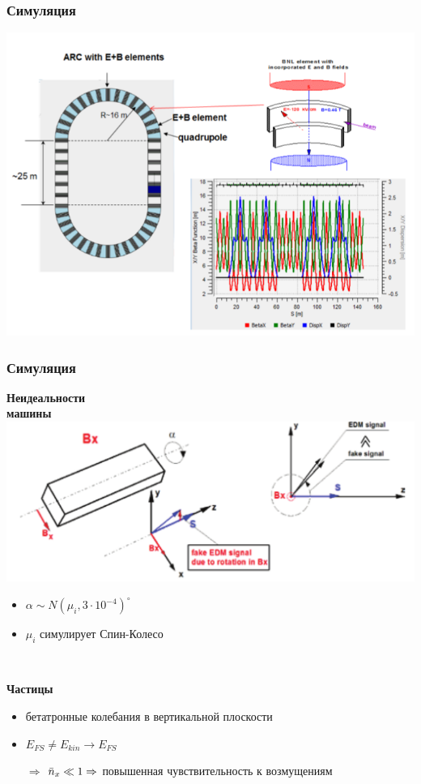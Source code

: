 \documentclass[14pt]{beamer}
\begin{document}
\begin{frame}\frametitle{Симуляция}\centering
	\includegraphics[width=.8\linewidth]{chapter2/BNL_lattice}
\end{frame}
\begin{frame}\frametitle{Симуляция}
	\begin{minipage}[t]{.48\linewidth}
		\textbf{Неидеальности\\ машины}
		\includegraphics[width=1.2\linewidth, trim=80 10 0 0, clip]{images/magnet_tilting}
		\begin{itemize}
			\item $\alpha\sim N(\mu_i, 3\cdot10^{-4})^\circ$
			\item $\mu_i$ симулирует Спин-Колесо 
		\end{itemize}
	\end{minipage}~~~~
	\begin{minipage}[t]{.45\linewidth}
		\textbf{Частицы}
		\begin{itemize}
			\item бетатронные колебания в вертикальной плоскости
			\item $E_{FS}\neq E_{kin}\to E_{FS}$
			\item[$\Rightarrow$] $\bar n_x\ll 1 \Rightarrow$ повышенная чувствительность к возмущениям
		\end{itemize}
	\end{minipage}
\end{frame}
\end{document}

